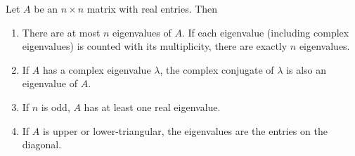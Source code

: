 \begin{theorem} Let $A$ be an $n\times n$ matrix with real entries. Then
\begin{enumerate}
\item There are at most $n$ eigenvalues of $A$. If each eigenvalue (including complex eigenvalues) is counted with its multiplicity, there are exactly $n$ eigenvalues.
\item If $A$ has a complex eigenvalue $\lambda$, the complex conjugate of $\lambda$ is also an eigenvalue of $A$.
\item If $n$ is odd, $A$ has at least one real eigenvalue.
\item If $A$ is upper or lower-triangular, the eigenvalues are the entries on the diagonal.
\end{enumerate}
\end{theorem}





